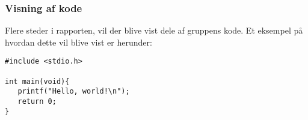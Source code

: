 \subsubsection{Visning af kode}
Flere steder i rapporten, vil der blive vist dele af gruppens kode. Et eksempel på hvordan dette vil blive vist er herunder:

\begin{lstlisting}[style=Cstyle, caption=Kodeeksempel i C]
#include <stdio.h>

int main(void){
   printf("Hello, world!\n");
   return 0;
}
\end{lstlisting}